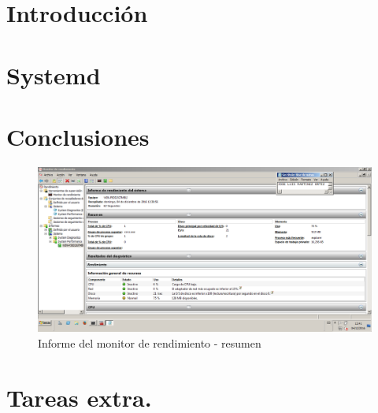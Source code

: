 
\section{Introducción}



\section{Systemd}



\section{Conclusiones}

\begin{figure}[H] %
\centering
\includegraphics[scale=0.4]{./imagenes/P3_4_1.png} 
\caption{Informe del monitor de rendimiento - resumen} \label{fig:P3_4_1}
\end{figure}


\section{Tareas extra.}


